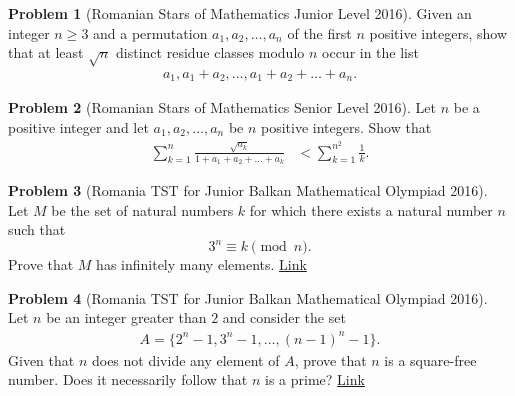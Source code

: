 \documentclass[]{article}
\theoremstyle{definition}
\newtheorem{problem}{Problem}
\begin{document}
\begin{problem}[Romanian Stars of Mathematics Junior Level 2016]
	Given an integer $n \geq 3$ and a permutation $a_1, a_2, \dots, a_n$ of the first $n$ positive integers, show that at least $\sqrt n$ distinct residue classes modulo $n$ occur in the list 
		\begin{align*}
			a_1, a_1 + a_2, \dots, a_1 + a_2 + \dots + a_n.
		\end{align*}
\end{problem}


\begin{problem}[Romanian Stars of Mathematics Senior Level 2016]
	Let $n$ be a positive integer and let $a_1, a_2, \dots, a_n$ be $n$ positive integers. Show that
		\begin{align*}
			\sum_{k=1}^{n} \frac{\sqrt{a_k}}{1+a_1+a_2+\dots +a_k} &< \sum_{k=1}^{n^2} \frac{1}{k}.
		\end{align*}
\end{problem}





\begin{problem}[Romania TST for Junior Balkan Mathematical Olympiad 2016]
	Let $M$ be the set of natural numbers $k$ for which there exists a natural number $n$ such that
	$$3^n \equiv k\pmod n.$$ Prove that $M$ has infinitely many elements. \hfill \href{http://artofproblemsolving.com/community/c6h1256385p6499304}{Link}
\end{problem}



\begin{problem}[Romania TST for Junior Balkan Mathematical Olympiad 2016]
	Let $n$ be an integer greater than $2$ and consider the set
		\begin{align*}
			A = \{2^n-1,3^n-1,\dots,(n-1)^n-1\}.
		\end{align*}
	Given that $n$ does not divide any element of $A$, prove that $n$ is a square-free number. Does it necessarily follow that $n$ is a prime? \hfill \href{http://artofproblemsolving.com/community/c6h1257385p6509508}{Link}
\end{problem}
\end{document}
